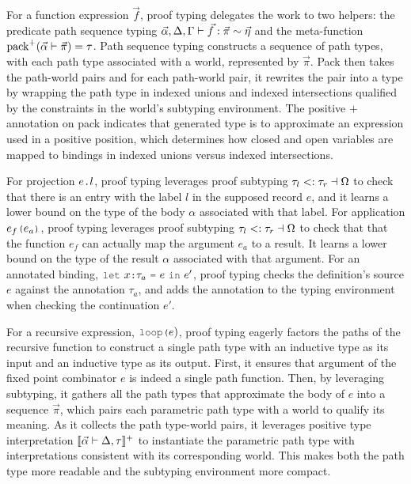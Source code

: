 \documentclass[acmsmall]{acmart}
\theoremstyle{definition}
\begin{document}
For a function expression $\vec{f}$, proof typing 
delegates the work to two helpers: 
the predicate path sequence typing $\vec{\alpha}, \Delta, \Gamma \vdash \vec{f} : \vec{\pi} \sim \vec{\eta}$
and the meta-function $\text{pack}^+(\vec{\alpha} \vdash \vec{\pi}) = \tau$.
Path sequence typing constructs a sequence of path types, 
with each path type associated with a world, represented by $\vec{\pi}$.
Pack then takes the path-world pairs and for each path-world pair,
it rewrites the pair into a type by wrapping the path type in indexed unions
and indexed intersections qualified by the constraints in the world's subtyping environment. 
The positive $+$ annotation on pack indicates that generated type 
is to approximate an expression used in a positive position,
which determines how closed and open variables are mapped to
bindings in indexed unions versus indexed intersections.


For projection $e\J{.}l$, proof typing
leverages proof subtyping $\tau_l <: \tau_r \dashv \Omega$ 
to check that there is an entry with the label $l$ 
in the supposed record $e$, and it learns a lower bound 
on the type of the body $\alpha$ associated with that label.
For application $e_f\J{(}e_a\J{)}$, proof typing
leverages proof subtyping $\tau_l <: \tau_r \dashv \Omega$
to check that that the function $e_f$ can actually
map the argument $e_a$ to a result. It learns a lower bound 
on the type of the result $\alpha$ associated with that argument.
For an annotated binding, $\J{let}\ x \J{:} \tau_a\ \J{=}\ e\ \J{in}\ e'$, 
proof typing checks the definition's source $e$ against the annotation $\tau_a$,
and adds the annotation to the typing environment when checking the continuation $e'$.

For a recursive expression, $\J{loop(}e{)}$, proof typing
eagerly factors the paths of the recursive function 
to construct a single path type with an inductive type as its input and an inductive type as its output. 
First, it ensures that argument of the fixed point combinator $e$ is indeed a 
single path function. 
Then, by leveraging subtyping, 
it gathers all the path types that approximate the body of $e$
into a sequence $\vec{\pi}$, which pairs each parametric path type with a world to qualify its meaning.
As it collects the path type-world pairs, it leverages positive type interpretation 
$\llbracket\vec{\alpha} \vdash \Delta, \tau \rrbracket^+$ 
to instantiate the parametric path type with interpretations consistent with its corresponding world. 
This makes both the path type more readable and the subtyping environment more compact.
\end{document}
